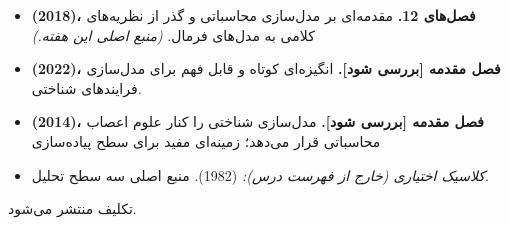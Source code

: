 \begin{itemize}
\tightlist
\item
  \textbf{ \lr{\&}  (2018)، فصل‌های 1\lr{--}2.} مقدمه‌ای
  بر مدل‌سازی محاسباتی و گذر از نظریه‌های کلامی به مدل‌های فرمال.
  \emph{(منبع اصلی این هفته.)}
\item
  \textbf{ (2022)، فصل مقدمه {[}بررسی شود{]}.} انگیزه‌ای
  کوتاه و قابل فهم برای مدل‌سازی فرایندهای شناختی.
\item
  \textbf{ (2014)، فصل مقدمه {[}بررسی شود{]}.} مدل‌سازی
  شناختی را کنار علوم اعصاب محاسباتی قرار می‌دهد؛ زمینه‌ای مفید برای سطح
  پیاده‌سازی 
\item
  \emph{کلاسیک اختیاری (خارج از فهرست درس):}  (1982).
  \emph{}  منبع اصلی سه سطح تحلیل.
\end{itemize}

تکلیف  منتشر می‌شود.
